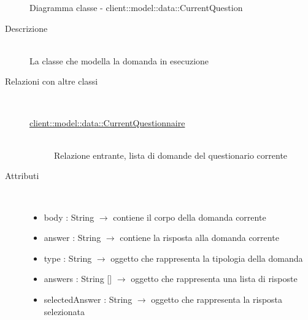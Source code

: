 \vspace{0.5cm}
\hypertarget{client::model::data::CurrentQuestion}{}
\begin{figure}[H]
	\centering
	\caption{Diagramma classe - client::model::data::CurrentQuestion}
\end{figure}\begin{description}
\item[Descrizione] \hfill \\
La classe che modella la domanda in esecuzione
\item[Relazioni con altre classi] \hfill \\
\vspace{-7mm}
\begin{description}
	\item[\hyperlink{client::model::data::CurrentQuestionnaire}{client::model::data::CurrentQuestionnaire}] \hfill \\
	Relazione entrante, lista di domande del questionario corrente
\end{description}

\item[Attributi] \hfill \\
\vspace{-7mm}
\begin{itemize}
	\item body : String $\rightarrow$ contiene il corpo della domanda corrente 
	\item answer : String $\rightarrow$ contiene la risposta alla domanda corrente
	\item type : String $\rightarrow$ oggetto che rappresenta la tipologia della domanda
	\item answers : String [] $\rightarrow$ oggetto che rappresenta una lista di risposte
	\item selectedAnswer : String $\rightarrow$ oggetto che rappresenta la risposta selezionata
\end{itemize}


\end{description}
